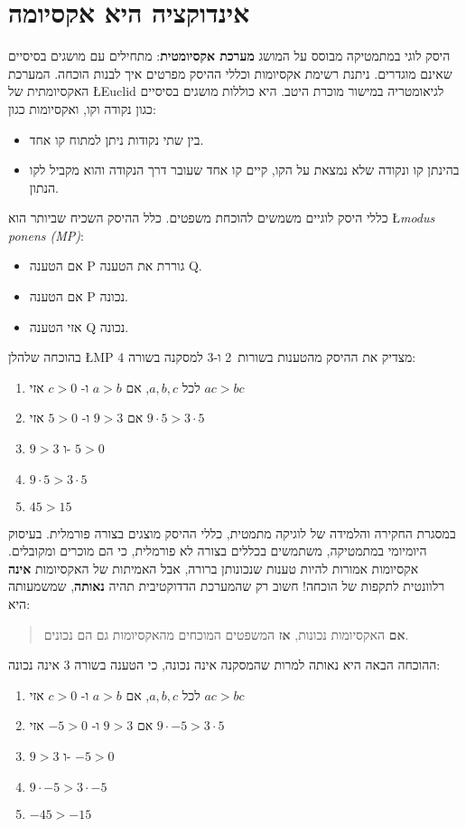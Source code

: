 \section{%
אינדוקציה היא אקסיומה}

היסק לוגי במתמטיקה מבוסס על המושג
\textbf{מערכת אקסיומטית}:
מתחילים עם מושגים בסיסיים שאינם מוגדרים. ניתנת רשימת אקסיומות וכללי ההיסק מפרטים איך לבנות הוכחה. המערכת האקסיומתית של
\L{Euclid}
לגיאומטריה במישור מוכרת היטב. היא כוללות מושגים בסיסיים כגון נקודה וקו, ואקסיומות כגון:
\begin{itemize}
\item
בין שתי נקודות ניתן למתוח קו אחד.
\item
בהינתן קו ונקודה שלא נמצאת על הקו, קיים קו אחד שעובר דרך הנקודה והוא מקביל לקו הנתון.
\end{itemize}
כללי היסק לוגיים משמשים להוכחת משפטים. כלל ההיסק השכיח שביותר הוא
\L{\emph{modus ponens (MP)}}:
\begin{itemize}
\item
אם הטענה P גוררת את הטענה Q.
\item
אם הטענה P נכונה.
\item
אזי הטענה Q נכונה.
\end{itemize}



בהוכחה שלהלן
\L{MP}
מצדיק את ההיסק מהטענות בשורות~2 ו-3 למסקנה בשורה 4:

\begin{enumerate}
\item לכל
$a,b,c$,
אם
$a>b$
ו-%
$c>0$
אזי
$ac>bc$
\item 
אם
$9>3$
ו-%
$5>0$
אזי
$9\cdot 5> 3\cdot 5$
\item $9>3$
ו-%
$5>0$
\item $9\cdot 5> 3\cdot 5$
\item $45>15$
\end{enumerate}
במסגרת החקירה והלמידה של לוגיקה מתמטית, כללי ההיסק מוצגים בצורה פורמלית. בעיסוק היומיומי במתמטיקה, משתמשים בכללים בצורה לא פורמלית, כי הם מוכרים ומקובלים. אקסיומות אמורות להיות טענות שנכונותן ברורה, אבל האמיתות של האקסיומות
\textbf{אינה}
רלוונטית לתקפות של הוכחה! חשוב רק שהמערכת הדדוקטיבית תהיה
\textbf{נאותה},
שמשמעותה היא:
\begin{quote}
\textbf{אם}
האקסיומות נכונות,
\textbf{אז}
המשפטים המוכחים מהאקסיומות גם הם נכונים.
\end{quote}
ההוכחה הבאה היא נאותה למרות שהמסקנה אינה נכונה, כי הטענה בשורה 3 אינה נכונה:
\begin{enumerate}
\item לכל
$a,b,c$,
אם
$a>b$
ו-%
$c>0$
אזי
$ac>bc$
\item 
אם
$9>3$
ו-%
$-5>0$
אזי
$9\cdot -5> 3\cdot 5$
\item $9>3$
ו-%
$-5>0$
\item $9\cdot -5> 3\cdot -5$
\item $-45>-15$
\end{enumerate}

